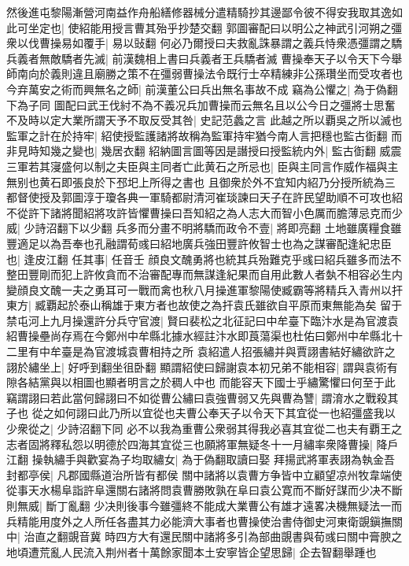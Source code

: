 然後進屯黎陽漸營河南益作舟船繕修器械分遣精騎抄其邊鄙令彼不得安我取其逸如此可坐定也|{
	使紹能用授言曹其殆乎抄楚交翻}
郭圖審配曰以明公之神武引河朔之彊衆以伐曹操易如覆手|{
	易以䜴翻}
何必乃爾授曰夫救亂誅暴謂之義兵恃衆憑彊謂之驕兵義者無敵驕者先滅|{
	前漢魏相上書曰兵義者王兵驕者滅}
曹操奉天子以令天下今舉師南向於義則違且廟勝之策不在彊弱曹操法令既行士卒精練非公孫瓚坐而受攻者也今弃萬安之術而興無名之師|{
	前漢董公曰兵出無名事故不成}
竊為公懼之|{
	為于偽翻下為子同}
圖配曰武王伐紂不為不義况兵加曹操而云無名且以公今日之彊將士思奮不及時以定大業所謂天予不取反受其咎|{
	史記范蠡之言}
此越之所以覇吳之所以滅也監軍之計在於持牢|{
	紹使授監護諸將故稱為監軍持牢猶今南人言把穩也監古衘翻}
而非見時知幾之變也|{
	幾居衣翻}
紹納圖言圖等因是譖授曰授監統内外|{
	監古衘翻}
威震三軍若其寖盛何以制之夫臣與主同者亡此黄石之所忌也|{
	臣與主同言作威作福與主無别也黄石即張良於下邳圯上所得之書也}
且御衆於外不宜知内紹乃分授所統為三都督使授及郭圖淳于瓊各典一軍騎都尉清河崔琰諫曰天子在許民望助順不可攻也紹不從許下諸將聞紹將攻許皆懼曹操曰吾知紹之為人志大而智小色厲而膽薄忌克而少威|{
	少詩沼翻下以少翻}
兵多而分畫不明將驕而政令不壹|{
	將即亮翻}
土地雖廣糧食雖豐適足以為吾奉也孔融謂荀彧曰紹地廣兵強田豐許攸智士也為之謀審配逢紀忠臣也|{
	逢皮江翻}
任其事|{
	任音壬}
顔良文醜勇將也統其兵殆難克乎彧曰紹兵雖多而法不整田豐剛而犯上許攸貪而不治審配專而無謀逢紀果而自用此數人者埶不相容必生内變顔良文醜一夫之勇耳可一戰而禽也秋八月操進軍黎陽使臧霸等將精兵入青州以扞東方|{
	臧覇起於泰山稱雄于東方者也故使之為扞袁氏雖欲自平原而東無能為矣}
留于禁屯河上九月操還許分兵守官渡|{
	賢曰裴松之北征記曰中牟臺下臨汴水是為官渡袁紹曹操壘尚存焉在今鄭州中牟縣北據水經註汴水即莨蕩渠也杜佑曰鄭州中牟縣北十二里有中牟臺是為官渡城袁曹相持之所}
袁紹遣人招張繡并與賈詡書結好繡欲許之詡於繡坐上|{
	好呼到翻坐徂卧翻}
顯謂紹使曰歸謝袁本初兄弟不能相容|{
	謂與袁術有隙各結黨與以相圖也顯者明言之於稠人中也}
而能容天下國士乎繡驚懼曰何至于此竊謂詡曰若此當何歸詡曰不如從曹公繡曰袁強曹弱又先與曹為讐|{
	謂淯水之戰殺其子也}
從之如何詡曰此乃所以宜從也夫曹公奉天子以令天下其宜從一也紹彊盛我以少衆從之|{
	少詩沼翻下同}
必不以我為重曹公衆弱其得我必喜其宜從二也夫有覇王之志者固將釋私怨以明德於四海其宜從三也願將軍無疑冬十一月繡率衆降曹操|{
	降戶江翻}
操執繡手與歡宴為子均取繡女|{
	為于偽翻取讀曰娶}
拜揚武將軍表詡為執金吾封都亭侯|{
	凡郡國縣道治所皆有都侯}
關中諸將以袁曹方争皆中立顧望凉州牧韋端使從事天水楊阜詣許阜還關右諸將問袁曹勝敗孰在阜曰袁公寛而不斷好謀而少决不斷則無威|{
	斷丁亂翻}
少决則後事今雖彊終不能成大業曹公有雄才遠畧决機無疑法一而兵精能用度外之人所任各盡其力必能濟大事者也曹操使治書侍御史河東衛覬鎭撫關中|{
	治直之翻覬音冀}
時四方大有還民關中諸將多引為部曲覬書與荀彧曰關中膏腴之地頃遭荒亂人民流入荆州者十萬餘家聞本土安寧皆企望思歸|{
	企去智翻舉踵也}
